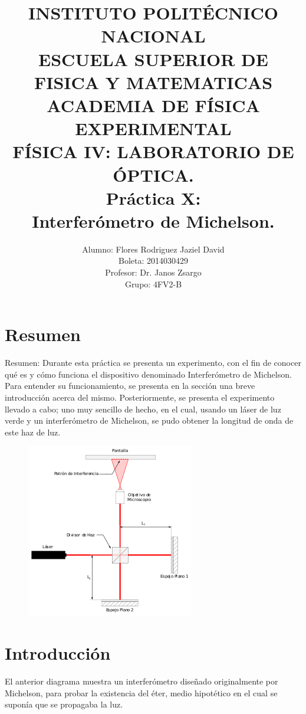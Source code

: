 \documentclass[13,twocolumn,letterpaper]{article}
\title{
    		\usefont{OT1}{bch}{b}{n}
    		\normalfont \normalsize \textsc{INSTITUTO POLITÉCNICO NACIONAL \\ 
    		ESCUELA SUPERIOR DE FISICA Y MATEMATICAS \\
    		ACADEMIA DE FÍSICA EXPERIMENTAL} \\ 
    		FÍSICA IV: LABORATORIO DE ÓPTICA. \\[10pt]
    		\huge Práctica X:\\
  Interferómetro de Michelson.\\
    }
\author[0]{Alumno: Flores Rodriguez Jaziel David \\
    Boleta: 2014030429 \\
    Profesor: Dr. Janos Zsargo\\
    Grupo: 4FV2-B \\
            }
\begin{document}
    
    \maketitle
   
    
    \section*{Resumen}
  Resumen: 
Durante esta práctica se presenta un experimento, con el fin de conocer qué es y cómo funciona el dispositivo denominado Interferómetro de Michelson. 
Para entender su funcionamiento, se presenta en la sección una breve introducción acerca del mismo. 
Posteriormente, se presenta el experimento llevado a cabo; uno muy sencillo de hecho, en el cual, usando un láser de luz verde y un interferómetro de Michelson, se pudo obtener la longitud de onda de este haz de luz.\\ 
 
 \begin{figure}[h]
	\centering
\includegraphics[width=\linewidth]{fig1.png}

	\label{fig:fig1}
\end{figure}


	\section*{Introducción}
El anterior diagrama muestra un interferómetro diseñado originalmente por Michelson, para probar la existencia del éter, medio hipotético en el cual se suponía que se propagaba la luz. \\
\end{document}
